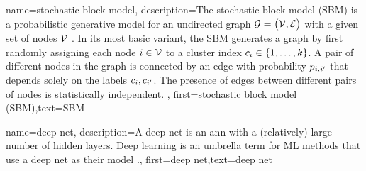 {name={stochastic block model},
	description={The stochastic block model (SBM) is a 
		probabilistic generative model for an undirected graph $\mathcal{G} = \big( \mathcal{V}, \mathcal{E} \big)$ 
		with a given set of nodes $\mathcal{V}$ \cite{AbbeSBM2018}. In its most basic variant, 
		the SBM generates a graph by first randomly assigning each node $i \in \mathcal{V}$ to 
		a cluster index $c_{i} \in \{1,\ldots,k\}$. A pair of different nodes in the 
		graph is connected by an edge with probability $p_{i,i'}$ that depends 
		solely on the labels $c_{i}, c_{i'}$. 
		The presence of edges between different pairs of 
		nodes is statistically independent. },
	first={stochastic block model (SBM)},text={SBM} 
}

{name={deep net},
	description={A deep net is an \gls{ann} with a (relatively) large number of 
	hidden layers. Deep learning is an umbrella term for ML methods that use a deep net as 
	their model \cite{Goodfellow-et-al-2016}.},
	first={deep net},text={deep net} 
}

\newcommand{\gaussiancenter}{3}

